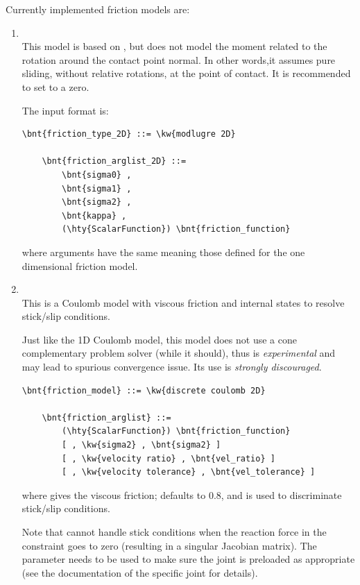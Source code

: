 Currently implemented friction models are:
\begin{enumerate}
    \item {}\\
    This model is based on \cite{Waltersson_Karayiannidis_2024}, but
    does not model the moment related to the rotation around the contact point normal.
    In other words,it assumes pure sliding, without relative rotations, at the point of contact.
    It is recommended to set  to a zero.

    The input format is:
\begin{Verbatim}[commandchars=\\\{\}]
    \bnt{friction_type_2D} ::= \kw{modlugre 2D}

    \bnt{friction_arglist_2D} ::=
        \bnt{sigma0} ,
        \bnt{sigma1} ,
        \bnt{sigma2} ,
        \bnt{kappa} ,
        (\hty{ScalarFunction}) \bnt{friction_function}
\end{Verbatim}
where arguments have the same meaning those defined for the  one dimensional friction model.

    \item {}\\
    This is a Coulomb model with viscous friction and
    internal states to resolve stick/slip conditions.

    Just like the 1D Coulomb model, this model does not use a cone complementary problem solver (while it should),
    thus is \emph{experimental} and may lead to spurious convergence issue. Its use is \emph{strongly discouraged}.
\begin{Verbatim}[commandchars=\\\{\}]
    \bnt{friction_model} ::= \kw{discrete coulomb 2D}

    \bnt{friction_arglist} ::=
        (\hty{ScalarFunction}) \bnt{friction_function}
        [ , \kw{sigma2} , \bnt{sigma2} ]
        [ , \kw{velocity ratio} , \bnt{vel_ratio} ]
        [ , \kw{velocity tolerance} , \bnt{vel_tolerance} ]
\end{Verbatim}
    where  gives the viscous friction;
     defaults to 0.8, and is used
    to discriminate stick/slip conditions.

    Note that 
    cannot handle stick conditions when the reaction force
    in the constraint goes to zero (resulting in a singular Jacobian matrix).
    The  parameter needs to be used to make sure
    the joint is preloaded as appropriate
    (see the documentation of the specific joint for details).


\end{enumerate}
